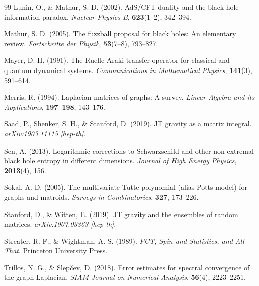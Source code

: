 \documentclass[12pt]{article}
\theoremstyle{definition}
\begin{document}
\begin{thebibliography}{99}
 Lunin, O., \& Mathur, S. D. (2002). AdS/CFT duality and the black hole information paradox. \textit{Nuclear Physics B}, \textbf{623}(1--2), 342--394.

 Mathur, S. D. (2005). The fuzzball proposal for black holes: An elementary review. \textit{Fortschritte der Physik}, \textbf{53}(7--8), 793--827.

 Mayer, D. H. (1991). The Ruelle-Araki transfer operator for classical and quantum dynamical systems. \textit{Communications in Mathematical Physics}, \textbf{141}(3), 591--614.

 Merris, R. (1994). Laplacian matrices of graphs: A survey. \textit{Linear Algebra and its Applications}, \textbf{197--198}, 143--176.

 Saad, P., Shenker, S. H., \& Stanford, D. (2019). JT gravity as a matrix integral. \textit{arXiv:1903.11115 [hep-th]}.

 Sen, A. (2013). Logarithmic corrections to Schwarzschild and other non-extremal black hole entropy in different dimensions. \textit{Journal of High Energy Physics}, \textbf{2013}(4), 156.

 Sokal, A. D. (2005). The multivariate Tutte polynomial (alias Potts model) for graphs and matroids. \textit{Surveys in Combinatorics}, \textbf{327}, 173--226.

 Stanford, D., \& Witten, E. (2019). JT gravity and the ensembles of random matrices. \textit{arXiv:1907.03363 [hep-th]}.

 Streater, R. F., \& Wightman, A. S. (1989). \textit{PCT, Spin and Statistics, and All That}. Princeton University Press.

 Trillos, N. G., \& Slep\v{c}ev, D. (2018). Error estimates for spectral convergence of the graph Laplacian. \textit{SIAM Journal on Numerical Analysis}, \textbf{56}(4), 2223--2251.

\end{thebibliography}
\end{document}
